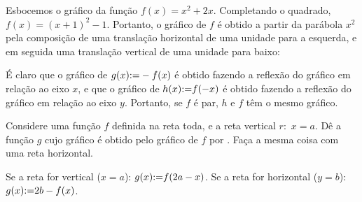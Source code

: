 \begin{ex}\label{exemplo_Funcoes_grafparabdesloc}
 Esbocemos o gráfico da função $f(x)=x^2+2x$. Completando o quadrado, $f(x)=(x+1)^2-1$. Portanto, o gráfico de $f$ é obtido a partir da
parábola $x^2$ pela composição de uma translação horizontal de uma
unidade para a esquerda, e em seguida uma translação vertical de uma unidade para
baixo:
\begin{center}
\begin{bmlimage}\end{bmlimage}
\end{center}
\end{ex}

É claro que o gráfico de $g(x){:=} -f(x)$ é obtido fazendo a reflexão
do gráfico em relação ao eixo $x$, e que o gráfico de $h(x){:=} f(-x)$ é obtido fazendo
a reflexão do gráfico em relação ao eixo $y$. Portanto, se $f$ é par, $h$ e $f$ têm o
mesmo gráfico. 

\begin{exo}
Considere uma função $f$ definida na reta toda, e a reta vertical $r:$ $x=a$.
Dê a função $g$ cujo gráfico é obtido pelo gráfico de $f$ por . Faça a mesma coisa com uma reta horizontal.
\begin{sol}
Se a reta for vertical ($x=a$): $g(x){:=} f(2a-x)$.
Se a reta for horizontal ($y=b$): $g(x){:=} 2b-f(x)$.
\end{sol}
\end{exo}

